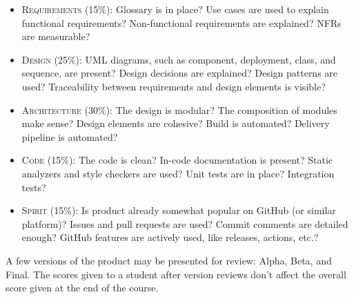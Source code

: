 \documentclass[nobrand,anonymous,nodate,nosecurity]{huawei}
\begin{document}
\begin{itemize}
\item {\scshape Requirements} (15\%):
  Glossary is in place?
  Use cases are used to explain functional requirements?
  Non-functional requirements are explained?
  NFRs are measurable?
\item {\scshape Design} (25\%):
  UML diagrams, such as component, deployment, class, and sequence, are present?
  Design decisions are explained?
  Design patterns are used?
  Traceability between requirements and design elements is visible?
\item {\scshape Architecture} (30\%):
  The design is modular?
  The composition of modules make sense?
  Design elements are cohesive?
  Build is automated?
  Delivery pipeline is automated?
\item {\scshape Code} (15\%):
  The code is clean?
  In-code documentation is present?
  Static analyzers and style checkers are used?
  Unit tests are in place?
  Integration tests?
\item {\scshape Spirit} (15\%):
  Is product already somewhat popular on GitHub (or similar platform)?
  Issues and pull requests are used?
  Commit comments are detailed enough?
  GitHub features are actively used, like releases, actions, etc.?
\end{itemize}

A few versions of the product may be presented for review:
Alpha, Beta, and Final. The scores given to a student
after version reviews don't affect the overall
score given at the end of the course.
\end{document}
